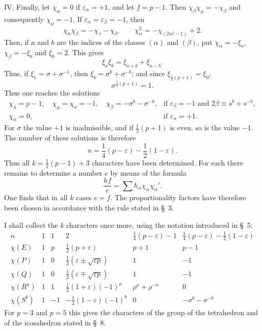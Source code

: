 \documentclass[11pt]{article}
\begin{document}
IV. Finally, let $\chi_\alpha=0$ if $\varepsilon_\alpha=+1$, and let $f=p-1$. Then $\chi_\beta\chi_\mu=-\chi_\beta$ and consequently $\chi_\mu=-1$. If $\varepsilon_\alpha=\varepsilon_\beta=-1$, then
\[
\chi_\alpha\chi_\beta=-\chi_\gamma-\chi_\delta,\qquad
\chi_\alpha^2=-\chi_{(2\alpha^2-1)}+2.
\]
Then, if $a$ and $b$ are the indices of the classes $(\alpha)$ and $(\beta)$, put $\chi_\alpha=-\xi_a$, $\chi_\beta=-\xi_b$ and $\xi_0=2$. This gives
\[
\xi_a\xi_b=\xi_{a+b}+\xi_{a-b}.
\]
Thus, if $\xi_1=\sigma+\sigma^{-1}$, then $\xi_b=\sigma^b+\sigma^{-b}$; and since $\xi_{\frac12(p+1)}=\xi_0$,
\begin{equation*}\tag{11.}
\sigma^{\frac12(p+1)}=1.
\end{equation*}
Thus one reaches the solutions
\[
\begin{array}{ll}
\chi_\lambda=p-1,\quad \chi_\mu=\chi_\nu=-1,\quad
\chi_\beta=-\sigma^b-\sigma^{-b},&
\text{if }\varepsilon_\beta=-1\text{ and }2\beta\equiv s^b+s^{-b},\\
\chi_\alpha=0,&
\text{if }\varepsilon_\alpha=+1.
\end{array}
\]
For $\sigma$ the value $+1$ is inadmissible, and if $\frac12(p+1)$ is even, so is the value $-1$. The number of these solutions is therefore
\begin{equation*}\tag{12.}
n=\frac14(p-\varepsilon)-\frac12(1-\varepsilon).
\end{equation*}
Thus all $k=\frac12(p-1)+3$ characters have been determined. For each there remains to determine a number $e$ by means of the formula
\[
\frac{hf}{e}=\sum h_\alpha\chi_\alpha\chi_\alpha'.
\]
One finds that in all $k$ cases $e=f$. The proportionality factors have therefore been chosen in accordance with the rule stated in \S~3.

I shall collect the $k$ characters once more, using the notation introduced in \S~5:
\[
\begin{array}{c|ccccc}
n & 1 & 1 & 2 & \frac14(p-\varepsilon)-1 & \frac14(p-\varepsilon)-\frac12(1-\varepsilon)\\ \hline
\chi(E) & 1 & p & \frac12(p+\varepsilon) & p+1 & p-1\\
\chi(P) & 1 & 0 & \frac12(\varepsilon\pm\sqrt{\varepsilon p}) & 1 & -1\\
\chi(Q) & 1 & 0 & \frac12(\varepsilon\mp\sqrt{\varepsilon p}) & 1 & -1\\
\chi(R^a) & 1 & 1 & \frac12(1+\varepsilon)(-1)^a & \rho^a+\rho^{-a} & 0\\
\chi(S^b) & 1 & -1 & -\frac12(1-\varepsilon)(-1)^b & 0 & -\sigma^b-\sigma^{-b}
\end{array}
\]
For $p=3$ and $p=5$ this gives the characters of the group of the tetrahedron and of the icosahedron stated in \S~8.
\end{document}
